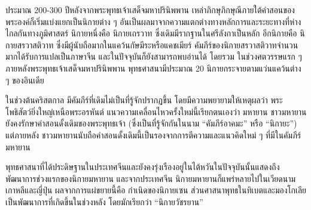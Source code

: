 \documentclass[12pt, openany]{book}
\begin{document}
ประมาณ 200-300 ปี{\wbr}หลัง{\wbr}จาก{\wbr}พระพุทธเจ้า{\wbr}เสด็จ{\wbr}มหา{\wbr}ปรินิพพาน เหล่า{\wbr}ภิกษุ{\wbr}ภิกษุณี{\wbr}ภาย{\wbr}ใต้{\wbr}คำ{\wbr}สอน{\wbr}ของ{\wbr}พระองค์{\wbr}ก็{\wbr}เริ่ม{\wbr}แบ่งแยก{\wbr}เป็น{\wbr}นิกาย{\wbr}ต่าง ๆ อัน{\wbr}เป็น{\wbr}ผล{\wbr}มา{\wbr}จาก{\wbr}ความ{\wbr}แตก{\wbr}ต่าง{\wbr}ทาง{\wbr}หลักการ{\wbr}และ{\wbr}ระยะ{\wbr}ทาง{\wbr}ที่{\wbr}ห่าง{\wbr}ไกล{\wbr}กัน{\wbr}ทาง{\wbr}ภูมิศาสตร์  นิกาย{\wbr}หนึ่ง{\wbr}คือ นิกาย{\wbr}เถรวาท ซึ่ง{\wbr}เดิม{\wbr}มี{\wbr}รากฐาน{\wbr}ใน{\wbr}ศรีลังกา{\wbr}เป็น{\wbr}หลัก  อีก{\wbr}นิกาย{\wbr}คือ นิกาย{\wbr}สร{\wbr}วา{\wbr}สติ{\wbr}วาท ซึ่ง{\wbr}มี{\wbr}ผู้{\wbr}นับถือ{\wbr}มาก{\wbr}ใน{\wbr}แคว้น{\wbr}กัษ{\wbr}มี{\wbr}ระ{\wbr}หรือ{\wbr}แคชเมียร์  คัมภีร์{\wbr}ของ{\wbr}นิกาย{\wbr}สร{\wbr}วา{\wbr}สติ{\wbr}วาท{\wbr}จำนวน{\wbr}มาก{\wbr}ได้{\wbr}รับ{\wbr}การ{\wbr}แปล{\wbr}เป็น{\wbr}ภาษา{\wbr}จีน และ{\wbr}ใน{\wbr}ปัจจุบัน{\wbr}ก็{\wbr}ยัง{\wbr}สามารถ{\wbr}พบ{\wbr}อ่าน{\wbr}ได้  โดย{\wbr}รวม ใน{\wbr}ช่วง{\wbr}ศตวรรษ{\wbr}แรก ๆ ภายหลัง{\wbr}พระพุทธเจ้า{\wbr}เสด็จ{\wbr}มหา{\wbr}ปรินิพพาน พุทธ{\wbr}ศาสนา{\wbr}มี{\wbr}ประมาณ 20 นิกาย{\wbr}กระจาย{\wbr}ตาม{\wbr}แว่นแคว้น{\wbr}ต่าง ๆ ของ{\wbr}อินเดีย 

ใน{\wbr}ช่วง{\wbr}ต้น{\wbr}คริสตกาล มี{\wbr}คัมภีร์{\wbr}ที่{\wbr}เดิม{\wbr}ไม่{\wbr}เป็น{\wbr}ที่{\wbr}รู้จัก{\wbr}ปรากฏ{\wbr}ขึ้น โดย{\wbr}มี{\wbr}ความ{\wbr}พยายาม{\wbr}ให้{\wbr}เหตุผล{\wbr}ว่า พระ{\wbr}โพธิสัตว์{\wbr}ยิ่งใหญ่{\wbr}เหนือ{\wbr}พระ{\wbr}อรหันต์  แนว{\wbr}ความ{\wbr}เคลื่อนไหว{\wbr}ครั้ง{\wbr}ใหม่{\wbr}นี้{\wbr}เรียก{\wbr}ตนเอง{\wbr}ว่า มหายาน  ชาว{\wbr}มหายาน{\wbr}ยัง{\wbr}คง{\wbr}รักษา{\wbr}คำ{\wbr}สอน{\wbr}ดั้งเดิม{\wbr}ของ{\wbr}พระพุทธเจ้า (ซึ่ง{\wbr}เป็น{\wbr}ที่{\wbr}รู้จัก{\wbr}กัน{\wbr}ใน{\wbr}นาม “คัมภีร์{\wbr}อา{\wbr}ค{\wbr}มะ” หรือ “นิ{\wbr}กา{\wbr}ยะ”) แต่{\wbr}ภายหลัง ชาว{\wbr}มหายาน{\wbr}นับถือ{\wbr}คำ{\wbr}สอน{\wbr}ดั้งเดิม{\wbr}นี้{\wbr}เป็นรอง{\wbr}จาก{\wbr}การ{\wbr}ตีความ{\wbr}และ{\wbr}แนวคิด{\wbr}ใหม่ ๆ ที่{\wbr}มี{\wbr}ใน{\wbr}คัมภีร์{\wbr}มหายาน{\wbr}

พุทธ{\wbr}ศาสนา{\wbr}ที่{\wbr}ได้{\wbr}ประดิษฐาน{\wbr}ใน{\wbr}ประเทศ{\wbr}จีน{\wbr}และ{\wbr}ยัง{\wbr}คง{\wbr}รุ่งเรือง{\wbr}อยู่{\wbr}ใน{\wbr}ไต้หวัน{\wbr}ใน{\wbr}ปัจจุบัน{\wbr}นั้น{\wbr}แสดง{\wbr}ถึง{\wbr}พัฒนาการ{\wbr}ช่วง{\wbr}แรก{\wbr}ของ{\wbr}นิกาย{\wbr}มหายาน  และ{\wbr}จาก{\wbr}ประเทศ{\wbr}จีน นิกาย{\wbr}มหายาน{\wbr}ก็{\wbr}แพร่หลาย{\wbr}ไป{\wbr}ใน{\wbr}เวียดนาม เกาหลี{\wbr}และ{\wbr}ญี่ปุ่น ผล{\wbr}จาก{\wbr}การ{\wbr}แผ่{\wbr}ขยาย{\wbr}นี้{\wbr}คือ กำเนิด{\wbr}ของ{\wbr}นิกาย{\wbr}เซน  ส่วน{\wbr}ศาสนา{\wbr}พุทธ{\wbr}ใน{\wbr}ทิเบต{\wbr}และ{\wbr}มองโกเลีย{\wbr}เป็น{\wbr}พัฒนาการ{\wbr}ที่{\wbr}เกิด{\wbr}ขึ้น{\wbr}ใน{\wbr}ช่วง{\wbr}หลัง โดย{\wbr}มัก{\wbr}เรียก{\wbr}ว่า “นิกาย{\wbr}วัชรยาน”  
\end{document}
